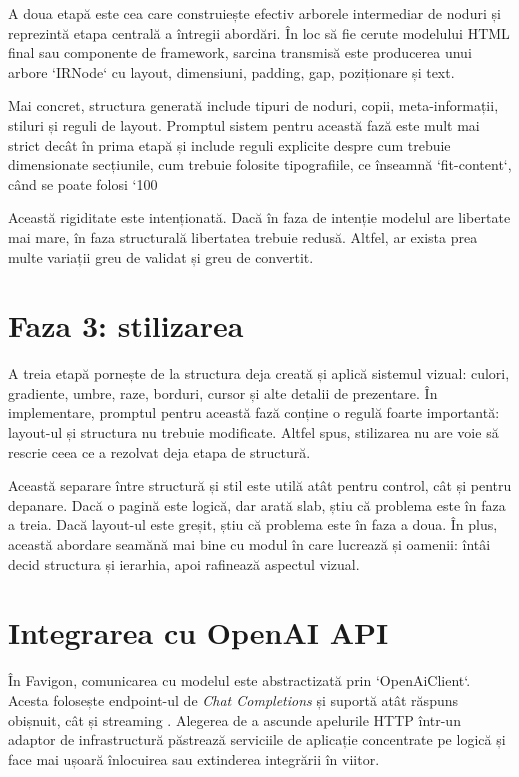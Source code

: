 A doua etapă este cea care construiește efectiv arborele intermediar de noduri și reprezintă etapa centrală a întregii abordări. În loc să fie cerute modelului HTML final sau componente de framework, sarcina transmisă este producerea unui arbore `IRNode` cu layout, dimensiuni, padding, gap, poziționare și text.

Mai concret, structura generată include tipuri de noduri, copii, meta-informații, stiluri și reguli de layout. Promptul sistem pentru această fază este mult mai strict decât în prima etapă și include reguli explicite despre cum trebuie dimensionate secțiunile, cum trebuie folosite tipografiile, ce înseamnă `fit-content`, când se poate folosi `100%

Această rigiditate este intenționată. Dacă în faza de intenție modelul are libertate mai mare, în faza structurală libertatea trebuie redusă. Altfel, ar exista prea multe variații greu de validat și greu de convertit.

\section{Faza 3: stilizarea}

A treia etapă pornește de la structura deja creată și aplică sistemul vizual: culori, gradiente, umbre, raze, borduri, cursor și alte detalii de prezentare. În implementare, promptul pentru această fază conține o regulă foarte importantă: layout-ul și structura nu trebuie modificate. Altfel spus, stilizarea nu are voie să rescrie ceea ce a rezolvat deja etapa de structură.

Această separare între structură și stil este utilă atât pentru control, cât și pentru depanare. Dacă o pagină este logică, dar arată slab, știu că problema este în faza a treia. Dacă layout-ul este greșit, știu că problema este în faza a doua. În plus, această abordare seamănă mai bine cu modul în care lucrează și oamenii: întâi decid structura și ierarhia, apoi rafinează aspectul vizual.

\section{Integrarea cu OpenAI API}

În Favigon, comunicarea cu modelul este abstractizată prin `OpenAiClient`. Acesta folosește endpoint-ul de \textit{Chat Completions} și suportă atât răspuns obișnuit, cât și streaming \cite{openaiChatCompletions2026}. Alegerea de a ascunde apelurile HTTP într-un adaptor de infrastructură păstrează serviciile de aplicație concentrate pe logică și face mai ușoară înlocuirea sau extinderea integrării în viitor.

